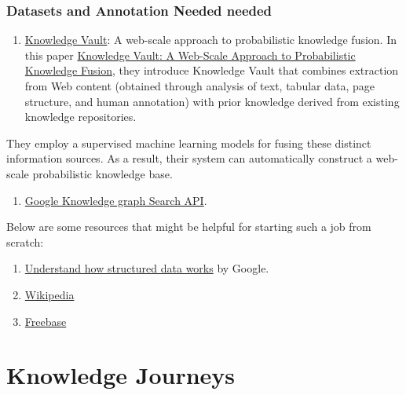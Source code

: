 \documentclass{acm_proc_article-sp}
\providecommand{\tightlist}{%
  \setlength{\itemsep}{0pt}\setlength{\parskip}{0pt}}
\begin{document}
\subsubsection{Datasets and Annotation Needed
needed}\label{datasets-and-annotation-needed-needed}

\begin{enumerate}
\def\labelenumi{\arabic{enumi}.}
\tightlist
\item
  \href{https://ai.google/research/pubs/pub45634}{Knowledge Vault}: A
  web-scale approach to probabilistic knowledge fusion. In this paper
  \href{https://dejanseo.com.au/wp-content/uploads/2014/08/Knowledge-Vault-A-Web-Scale-Approach-to-Probabilistic-Knowledge-Fusion.pdf}{Knowledge
  Vault: A Web-Scale Approach to Probabilistic Knowledge Fusion}, they
  introduce Knowledge Vault that combines extraction from Web content
  (obtained through analysis of text, tabular data, page structure, and
  human annotation) with prior knowledge derived from existing knowledge
  repositories.
\end{enumerate}

They employ a supervised machine learning models for fusing these
distinct information sources. As a result, their system can
automatically construct a web-scale probabilistic knowledge base.

\begin{enumerate}
\def\labelenumi{\arabic{enumi}.}
\setcounter{enumi}{1}
\tightlist
\item
  \href{https://developers.google.com/knowledge-graph/\#knowledge_graph_entities}{Google
  Knowledge graph Search API}.
\end{enumerate}

Below are some resources that might be helpful for starting such a job
from scratch:

\begin{enumerate}
\def\labelenumi{\arabic{enumi}.}
\setcounter{enumi}{2}
\item
  \href{https://developers.google.com/search/docs/guides/intro-structured-data}{Understand
  how structured data works} by Google.
\item
  \href{wikipedia.com}{Wikipedia}
\item
  \href{Freebase.com}{Freebase}
\end{enumerate}

\section{Knowledge Journeys}\label{knowledge-journeys-1}
\end{document}
